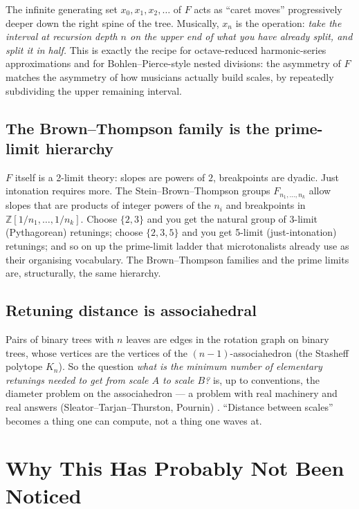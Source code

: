 \documentclass[11pt]{article}
\begin{document}
The infinite generating set $x_0, x_1, x_2, \ldots$ of $F$ acts as ``caret moves'' progressively deeper down the right spine of the tree. Musically, $x_n$ is the operation: \emph{take the interval at recursion depth $n$ on the upper end of what you have already split, and split it in half.} This is exactly the recipe for octave-reduced harmonic-series approximations and for Bohlen--Pierce-style nested divisions: the asymmetry of $F$ matches the asymmetry of how musicians actually build scales, by repeatedly subdividing the upper remaining interval.

\subsection*{The Brown--Thompson family is the prime-limit hierarchy}

$F$ itself is a 2-limit theory: slopes are powers of $2$, breakpoints are dyadic. Just intonation requires more. The Stein--Brown--Thompson groups $F_{n_1,\ldots,n_k}$ allow slopes that are products of integer powers of the $n_i$ and breakpoints in $\mathbb{Z}[1/n_1,\ldots,1/n_k]$. Choose $\{2,3\}$ and you get the natural group of 3-limit (Pythagorean) retunings; choose $\{2,3,5\}$ and you get 5-limit (just-intonation) retunings; and so on up the prime-limit ladder that microtonalists already use as their organising vocabulary. The Brown--Thompson families and the prime limits are, structurally, the same hierarchy.

\subsection*{Retuning distance is associahedral}

Pairs of binary trees with $n$ leaves are edges in the rotation graph on binary trees, whose vertices are the vertices of the $(n-1)$-associahedron (the Stasheff polytope $K_n$). So the question \emph{what is the minimum number of elementary retunings needed to get from scale $A$ to scale $B$?} is, up to conventions, the diameter problem on the associahedron --- a problem with real machinery and real answers (Sleator--Tarjan--Thurston, Pournin) \cite{STT,Pournin}. ``Distance between scales'' becomes a thing one can compute, not a thing one waves at.

\section{Why This Has Probably Not Been Noticed}
\end{document}
